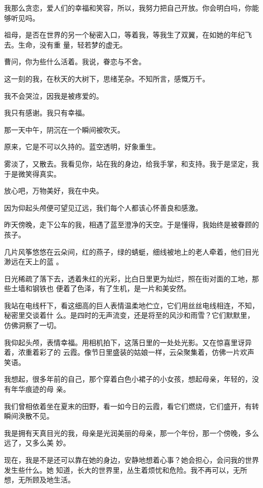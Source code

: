 \documentclass[12pt,a4paper]{article}
\begin{document}
		我那么贪恋，爱人们的幸福和笑容，所以，我努力把自己开放。你会明白吗，你能够听见吗。

		祖母，是否在世界的另一个秘密入口，等着我，等我生了双翼，在如她的年纪飞去。生命，没有重
	量，轻若梦的虚无。


		曹问，你为些什么活着。我说，眷恋与不舍。

		这一刻的我，在秋天的大树下，思绪芜杂。不知所言，感慨万千。

		我不会哭泣，因我是被疼爱的。

		我只有感谢。我只有幸福。


		那一天中午，阴沉在一个瞬间被吹灭。

		原来，它是不可以久持的。蓝空透明，好象重生。

		雾淡了，又散去。我看见你，站在我的身边，给我手掌，和支持。我于是坚定，我于是微笑得真实。


		放心吧，万物美好，我在中央。

	\endwriting



		因为仰起头颅便可望见辽远，我们每个人都该心怀善良和感激。


		昨天傍晚，走下公车的我，相遇了蓝至澄净的天空。于是懂得，我始终是被眷顾的孩子。

		几片风筝悠悠在云朵间，红的燕子，绿的蜻蜓，细线被地上的老人牵着，他们目光渺远在天上的蓝
	。

		日光稀疏了落下去，透着朱红的光彩，比白日里更为灿烂，照在街对面的工地，那些土墙和钢铁也
	便着了色泽，有了生机，是一片和美安然。

		我站在电线杆下，看这细高的巨人表情温柔地伫立，它们用丝丝电线相连，不知，秘密里交谈着什
	么。是四时的无声流变，还是将至的风沙和雨雪？它们默默里，仿佛洞察了一切。


		我仰起头颅，表情幸福。用相机拍下，这落日里的一处处光影。又在惊喜里讶异着，浓重着彩了的
	云霞。像节日里盛装的姑娘一样，云朵聚集着，仿佛一片欢声笑语。

		我想起，很多年前的自己，那个穿着白色小裙子的小女孩，想起母亲，年轻的，没有年华痕迹的母
	亲。

		我们曾相依着坐在夏末的田野，看一如今日的云霞，看它们燃烧，它们盛开，有转瞬间涣散不见。

		我是拥有天真目光的我，母亲是光润美丽的母亲，那一个年份，那一个傍晚，多么远了，又多么美
	妙。

		现在，我是不是还可以靠在她的身边，安静地想着心事？她会担心，会问我的世界发生些什么。她
	知道，长大的世界里，丛生着烦忧和危险。我不再可以，无所想，无所顾及地生活。
\end{document}
